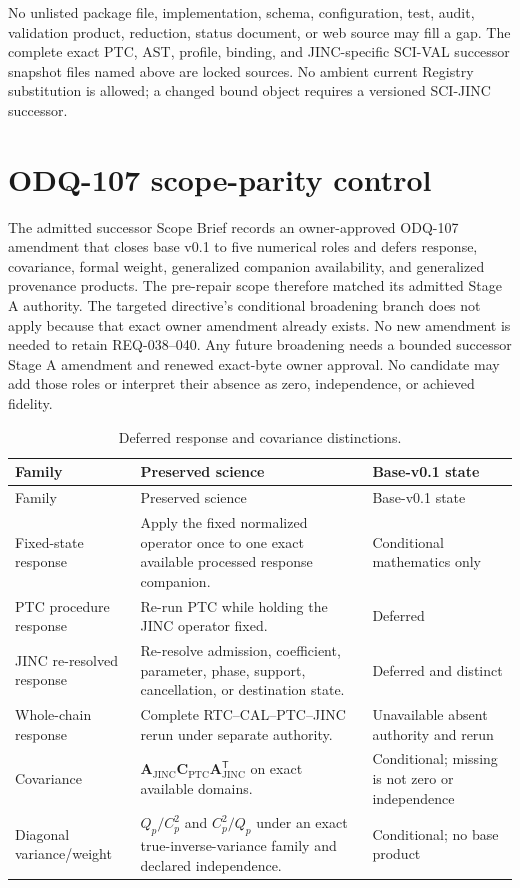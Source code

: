 \documentclass[10pt]{article}
\begin{document}
No unlisted package file, implementation, schema, configuration, test, audit,
validation product, reduction, status document, or web source may fill a gap.
The complete exact PTC, AST, profile, binding, and JINC-specific SCI-VAL
successor snapshot files named above are locked sources.  No ambient current
Registry substitution is allowed; a changed bound object requires a versioned
SCI-JINC successor.

\section{ODQ-107 scope-parity control}
\label{sec:eng-scope-parity}

The admitted successor Scope Brief records an owner-approved ODQ-107 amendment
that closes base v0.1 to five numerical roles and defers response, covariance,
formal weight, generalized companion availability, and generalized provenance
products.  The pre-repair scope therefore matched its admitted Stage A authority.
The targeted directive's conditional broadening branch does not apply because
that exact owner amendment already exists.  No new amendment is needed to
retain REQ-038--040.  Any future broadening needs a bounded successor Stage A
amendment and renewed exact-byte owner approval.  No candidate may add those
roles or interpret their absence as zero, independence, or achieved fidelity.

\begin{longtable}{@{}>{\raggedright\arraybackslash}p{}
                        >{\raggedright\arraybackslash}p{}
                        >{\raggedright\arraybackslash}p{}@{}}
\caption{Deferred response and covariance distinctions.}\label{tab:eng-deferred}\\
\toprule
Family & Preserved science & Base-v0.1 state \\
\midrule
\endfirsthead
\toprule
Family & Preserved science & Base-v0.1 state \\
\midrule
\endhead
Fixed-state response & Apply the fixed normalized operator once to one exact
available processed response companion. & Conditional mathematics only \\
PTC procedure response & Re-run PTC while holding the JINC operator fixed. &
Deferred \\
JINC re-resolved response & Re-resolve admission, coefficient, parameter,
phase, support, cancellation, or destination state. & Deferred and distinct \\
Whole-chain response & Complete RTC--CAL--PTC--JINC rerun under separate
authority. & Unavailable absent authority and rerun \\
Covariance & $\mathbf A_{\mathrm{JINC}}\mathbf C_{\mathrm{PTC}}
\mathbf A_{\mathrm{JINC}}^{\mathsf T}$ on exact available domains. &
Conditional; missing is not zero or independence \\
Diagonal variance/weight & $Q_p/C_p^2$ and $C_p^2/Q_p$ under an exact
true-inverse-variance family and declared independence. & Conditional; no
base product \\
\bottomrule
\end{longtable}
\end{document}

